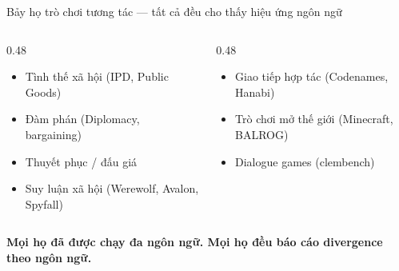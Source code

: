 \documentclass[11pt,aspectratio=169]{beamer}
\newcommand{\takeaway}[1]{%
  \begin{center}
    \colorbox{rsnavy!10}{%
      \begin{minipage}{0.92\textwidth}
        \centering\textbf{#1}
      \end{minipage}}
  \end{center}}
\begin{document}
\begin{frame}{Bảy họ trò chơi tương tác --- tất cả đều cho thấy hiệu ứng ngôn ngữ}
    \large
    \begin{columns}[T]
        \begin{column}{0.48\textwidth}
            \begin{itemize}
                \setlength\itemsep{0.3em}
                \item Tình thế xã hội (IPD, Public Goods)
                \item Đàm phán (Diplomacy, bargaining)
                \item Thuyết phục / đấu giá
                \item Suy luận xã hội (Werewolf, Avalon, Spyfall)
            \end{itemize}
        \end{column}
        \begin{column}{0.48\textwidth}
            \begin{itemize}
                \setlength\itemsep{0.3em}
                \item Giao tiếp hợp tác (Codenames, Hanabi)
                \item Trò chơi mở thế giới (Minecraft, BALROG)
                \item Dialogue games (clembench)
            \end{itemize}
        \end{column}
    \end{columns}
    \vspace{0.5cm}
    \takeaway{Mọi họ đã được chạy đa ngôn ngữ. Mọi họ đều báo cáo divergence theo ngôn ngữ.}
\end{frame}
\end{document}
